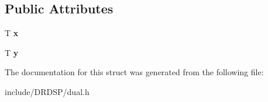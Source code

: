 \subsection*{Public Attributes}
\begin{DoxyCompactItemize}
\item 
\hypertarget{struct_d_r_d_s_p_1_1dual_aa10eb23e32f77dacdc868c9a1df38b69}{T {\bfseries x}}\label{struct_d_r_d_s_p_1_1dual_aa10eb23e32f77dacdc868c9a1df38b69}

\item 
\hypertarget{struct_d_r_d_s_p_1_1dual_acc5892de3194e38d4c504467cfaa9da7}{T {\bfseries y}}\label{struct_d_r_d_s_p_1_1dual_acc5892de3194e38d4c504467cfaa9da7}

\end{DoxyCompactItemize}


The documentation for this struct was generated from the following file\-:\begin{DoxyCompactItemize}
\item 
include/\-D\-R\-D\-S\-P/dual.\-h\end{DoxyCompactItemize}
